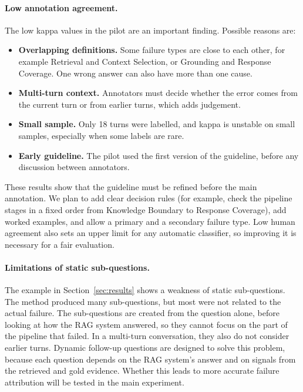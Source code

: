 \documentclass[11pt]{article}
\begin{document}
\paragraph{Low annotation agreement.}
The low kappa values in the pilot are an important finding. Possible reasons are:
\begin{itemize}
  \item \textbf{Overlapping definitions.} Some failure types are close to each other, for example Retrieval and Context Selection, or Grounding and Response Coverage. One wrong answer can also have more than one cause.
  \item \textbf{Multi-turn context.} Annotators must decide whether the error comes from the current turn or from earlier turns, which adds judgement.
  \item \textbf{Small sample.} Only 18 turns were labelled, and kappa is unstable on small samples, especially when some labels are rare.
  \item \textbf{Early guideline.} The pilot used the first version of the guideline, before any discussion between annotators.
\end{itemize}
These results show that the guideline must be refined before the main annotation. We plan to add clear decision rules (for example, check the pipeline stages in a fixed order from Knowledge Boundary to Response Coverage), add worked examples, and allow a primary and a secondary failure type. Low human agreement also sets an upper limit for any automatic classifier, so improving it is necessary for a fair evaluation.

\paragraph{Limitations of static sub-questions.}
The example in Section~\ref{sec:results} shows a weakness of static sub-questions. The method produced many sub-questions, but most were not related to the actual failure. The sub-questions are created from the question alone, before looking at how the RAG system answered, so they cannot focus on the part of the pipeline that failed. In a multi-turn conversation, they also do not consider earlier turns. Dynamic follow-up questions are designed to solve this problem, because each question depends on the RAG system's answer and on signals from the retrieved and gold evidence. Whether this leads to more accurate failure attribution will be tested in the main experiment.
\end{document}
